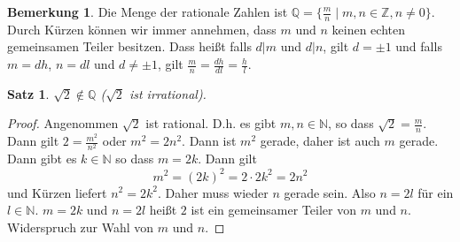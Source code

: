 \documentclass{article}
\theoremstyle{definition}
\newtheorem{bem}[definition]{Bemerkung}
\theoremstyle{plain}
\newtheorem{sa}[definition]{Satz}
\begin{document}
\begin{bem}
	Die Menge der rationale Zahlen ist
	$ \mathbb{Q} = \{ \frac{m}{n} \mid m,n \in \mathbb{Z}, n \neq 0 \} $. Durch Kürzen können wir immer annehmen, dass $ m $ und $ n $ keinen echten gemeinsamen Teiler besitzen. Dass heißt falls 
	$ d|m $ und $ d|n $, gilt $ d = \pm 1 $ und falls $ m=dh $, $ n=dl $ und $ d \neq \pm 1 $, gilt 
	$ \frac{m}{n} = \frac{dh}{dl} = \frac{h}{l} $.
\end{bem}
\begin{sa}
	$\sqrt{2} \notin \mathbb{Q} $ ($ \sqrt{2} $ ist irrational).
\end{sa}
\begin{proof}
	Angenommen $ \sqrt{2} $ ist rational. D.h. es gibt $ m,n \in \mathbb{N} $, so dass $ \sqrt{2} = \frac{m}{n} $. Dann gilt $ 2 = \frac{m^2}{n^2} $ oder $ m^2 = 2n^2 $. Dann ist $ m^2 $ gerade, daher ist auch $ m $ gerade. Dann gibt es $ k \in \mathbb{N} $ so dass $ m = 2k $. Dann gilt
	\[ 
	m^2 = (2k)^2 = 2\cdot 2k^2 = 2n^2
	 \]
	 und Kürzen liefert $ n^2 = 2k^2 $. Daher muss wieder $ n $ gerade sein. Also $ n = 2l $ für ein 
	 $ l \in \mathbb{N} $. $ m = 2k $ und $ n = 2l $ heißt $ 2 $ ist ein gemeinsamer Teiler von $ m $ und $ n $. Widerspruch zur Wahl von $ m $ und $ n $.
\end{proof}
\end{document}
